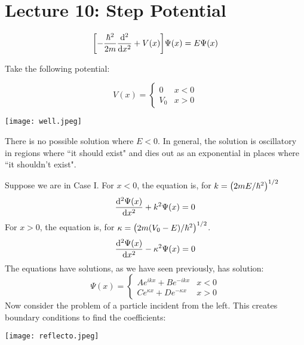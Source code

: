 \section{Lecture 10: Step Potential}

\begin{align*}
    \qty[-\frac{\hbar^2}{2m} \derivative{^2}{x^2} + V(x)] \Psi(x) = E \Psi(x)
\end{align*}

Take the following potential:

\[ V(x) = \begin{cases}
   0 & x < 0 \\
   V_0 & x > 0
\end{cases} \]

\texttt{[image: well.jpeg]}

There is no possible solution where $E<0$. In general, the solution is oscillatory in regions where ``it should exist" and dies
out as an exponential in places where ``it shouldn't exist".

Suppose we are in Case I.
For $x < 0$, the equation is, for $k = \qty(2mE/\hbar^2)^{1/2}$
\[ \derivative{^2 \Psi(x)}{x^2} + k^2 \Psi(x) = 0\]
For $x > 0$, the equation is, for $\kappa = \qty(2m(V_0 - E)/\hbar^2)^{1/2}$.
\[ \derivative{^2 \Psi(x)}{x^2} - {\kappa}^2 \Psi(x) = 0\]
The equations have solutions, as we have seen previously, has solution:
\[ \Psi(x) = \begin{cases} Ae^{ikx} + Be^{-ikx} & x < 0 \\ Ce^{\kappa x} + De^{-\kappa x} & x > 0 \end{cases} \]
Now consider the problem of a particle incident from the left. This creates boundary conditions to find the coefficients:

\texttt{[image: reflecto.jpeg]}

